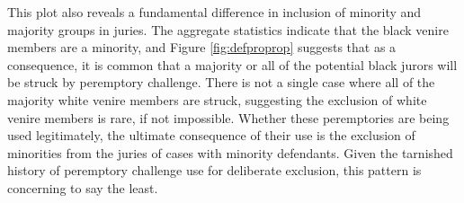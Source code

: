 This plot also reveals a fundamental difference in inclusion of minority and majority groups in juries. The aggregate statistics indicate that the
black venire members are a minority, and Figure \ref{fig:defproprop} suggests that as a consequence, it is common that a majority
or all of the potential black jurors will be struck by peremptory
challenge. There is not a single case where all of the majority white
venire members are struck, suggesting the exclusion of
white venire members is rare, if not impossible. Whether these
peremptories are being used legitimately, the ultimate consequence of
their use is the exclusion of minorities from the juries of cases with
minority defendants. Given the tarnished history of peremptory
challenge use for deliberate exclusion, this pattern is concerning to say the least.